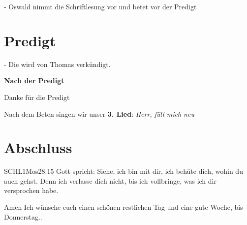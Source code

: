 \documentclass{../inc/mybib}
\begin{document}
- Oswald nimmt die Schriftlesung vor und betet vor der Predigt

\section{Predigt}
- Die wird von Thomas verkündigt.

\textbf{Nach der Predigt}

Danke für die Predigt

Nach dem Beten singen wir unser \textbf{3. Lied}: \textit{Herr, füll mich neu}\\

\section{Abschluss}

\begin{bibelbox}{SCHL}{1Mos}{28:15}
Gott spricht: Siehe, ich bin mit dir,
ich behüte dich, wohin du auch gehst.
Denn ich verlasse dich nicht,
bis ich vollbringe, was ich dir versprochen habe.
\end{bibelbox}
Amen
Ich wünsche euch einen schönen restlichen Tag und eine gute Woche, bis Donnerstag..
\end{document}

